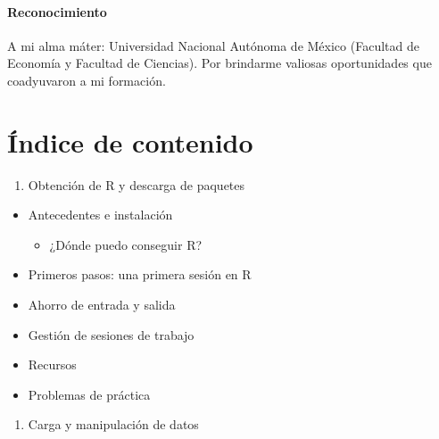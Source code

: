 \documentclass[
]{book}
\providecommand{\tightlist}{%
  \setlength{\itemsep}{0pt}\setlength{\parskip}{0pt}}
\begin{document}
\hypertarget{reconocimiento}{%
\subsubsection*{Reconocimiento}\label{reconocimiento}}

A mi alma máter: Universidad Nacional Autónoma de México (Facultad de Economía y Facultad de Ciencias). Por brindarme valiosas oportunidades que coadyuvaron a mi formación.

\hypertarget{uxedndice-de-contenido}{%
\chapter*{Índice de contenido}\label{uxedndice-de-contenido}}

\begin{enumerate}
\def\labelenumi{\arabic{enumi}.}
\tightlist
\item
  Obtención de R y descarga de paquetes
\end{enumerate}

\begin{itemize}
\tightlist
\item
  Antecedentes e instalación

  \begin{itemize}
  \tightlist
  \item
    ¿Dónde puedo conseguir R?
  \end{itemize}
\item
  Primeros pasos: una primera sesión en R
\item
  Ahorro de entrada y salida
\item
  Gestión de sesiones de trabajo
\item
  Recursos
\item
  Problemas de práctica
\end{itemize}

\begin{enumerate}
\def\labelenumi{\arabic{enumi}.}
\setcounter{enumi}{1}
\tightlist
\item
  Carga y manipulación de datos
\end{enumerate}
\end{document}
